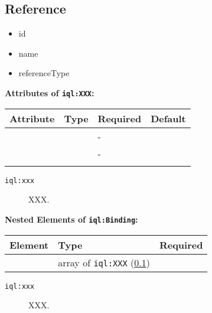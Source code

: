\documentclass[11pt]{article}
\newcommand{\iqlns}{iql:}
\newcommand{\iqlType}[1]{\texttt{\iqlns#1}}
\newcommand{\attributes}[1]{\noindent\textbf{Attributes of \iqlType{#1}:}\newline\medskip}
\newcommand{\elements}[1]{\noindent\textbf{Nested Elements of \iqlType{#1}:}\newline\medskip}
\begin{document}
\subsection{Reference}
\label{sec:json-ld-reference}
\begin{itemize}
\item id
\item name
\item referenceType
\end{itemize}
\attributes{XXX}
\begin{tabular}{|p{}|p{}|p{}|p{}|}
	\hline
	\textbf{Attribute} & \textbf{Type} & \textbf{Required} & \textbf{Default} \\ 
	\hline
	\hline
	&  & - &  \\ 
	\hline 
	&  & - &  \\ 
	\hline 
	&  &  & \\ 
	\hline 
\end{tabular}
\begin{description}
	\item[\iqlType{xxx}] XXX.
\end{description}
\elements{Binding}
\begin{tabular}{|p{}|p{}|p{}|}
	\hline
	\textbf{Element} & \textbf{Type} & \textbf{Required} \\ 
	\hline
	\hline 
	& array of \iqlType{XXX} (\ref{sec:json-ld-reference}) &  \\ 
	\hline 
\end{tabular}
\begin{description}
	\item[\iqlType{xxx}] XXX.
\end{description}

\end{document}
